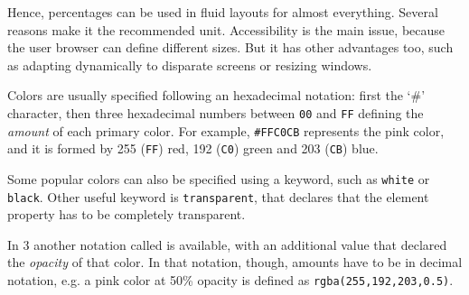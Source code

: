 Hence, percentages can be used in fluid layouts for almost everything.
Several reasons make it the recommended unit.
Accessibility is the main issue, because the user browser can define different sizes.
But it has other advantages too, such as adapting dynamically to disparate screens or resizing windows.

Colors are usually specified following an hexadecimal  notation: first the `\#' character, then three hexadecimal numbers between \texttt{00} and \texttt{FF} defining the \emph{amount} of each primary color.
For example, \texttt{\#FFC0CB} represents the pink color, and it is formed by 255 (\texttt{FF}) red, 192 (\texttt{C0}) green and 203 (\texttt{CB}) blue.

Some popular colors can also be specified using a keyword, such as \texttt{white} or \texttt{black}.
Other useful keyword is \texttt{transparent}, that declares that the element property has to be completely transparent.

In  3 another notation called  is available, with an additional value that declared the \emph{opacity} of that color.
In that notation, though, amounts have to be in decimal notation, e.g. a pink color at 50\% opacity is defined as \texttt{rgba(255,192,203,0.5)}.


